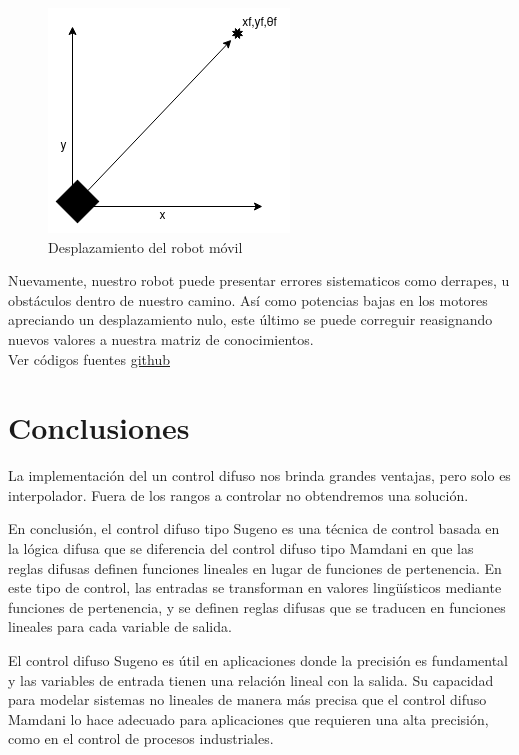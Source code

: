 \documentclass[oneside,onecolumn]{article}
\begin{document}
\begin{figure}[h]
  \centering
  \includegraphics[scale=0.7]{graficos/fuzzy_control.png}
  \caption{Desplazamiento del robot móvil}
\end{figure}

Nuevamente, nuestro robot puede presentar errores sistematicos como derrapes, u obstáculos dentro de nuestro camino. Así como potencias bajas en los motores apreciando un desplazamiento nulo, este último se puede correguir reasignando nuevos valores a nuestra matriz de conocimientos.\\

Ver códigos fuentes \href{https://github.com/luisballado/MobileRobotics/blob/765b278bdd76b460300f6093620ef75676cff66e/codes/fuzzy.nxc}{github}

\section{Conclusiones}

La implementación del un control difuso nos brinda grandes ventajas, pero solo es interpolador. Fuera de los rangos a controlar no obtendremos una solución.

En conclusión, el control difuso tipo Sugeno es una técnica de control basada en la lógica difusa que se diferencia del control difuso tipo Mamdani en que las reglas difusas definen funciones lineales en lugar de funciones de pertenencia. En este tipo de control, las entradas se transforman en valores lingüísticos mediante funciones de pertenencia, y se definen reglas difusas que se traducen en funciones lineales para cada variable de salida.

El control difuso Sugeno es útil en aplicaciones donde la precisión es fundamental y las variables de entrada tienen una relación lineal con la salida. Su capacidad para modelar sistemas no lineales de manera más precisa que el control difuso Mamdani lo hace adecuado para aplicaciones que requieren una alta precisión, como en el control de procesos industriales.
\end{document}
